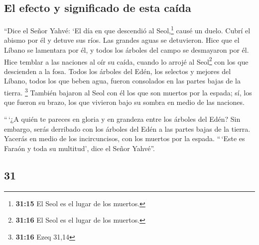 \begin{paracol}{2}
\hypertarget{el-efecto-y-significado-de-esta-cauxedda}{%
\subsection{El efecto y significado de esta
caída}\label{el-efecto-y-significado-de-esta-cauxedda}}

 ``Dice el Señor Yahvé: `El día en que descendió al
Seol,\footnote{\textbf{31:15} El Seol es el lugar de los muertos.} causé
un duelo. Cubrí el abismo por él y detuve sus ríos. Las grandes aguas se
detuvieron. Hice que el Líbano se lamentara por él, y todos los árboles
del campo se desmayaron por él.  Hice temblar a las
naciones al oír su caída, cuando lo arrojé al Seol\footnote{\textbf{31:16}
  El Seol es el lugar de los muertos.} con los que descienden a la fosa.
Todos los árboles del Edén, los selectos y mejores del Líbano, todos los
que beben agua, fueron consolados en las partes bajas de la tierra.
\footnote{\textbf{31:16} Ezeq 31,14}  También bajaron al
Seol con él los que son muertos por la espada; sí, los que fueron su
brazo, los que vivieron bajo su sombra en medio de las naciones.

 ``\,`¿A quién te pareces en gloria y en grandeza entre
los árboles del Edén? Sin embargo, serás derribado con los árboles del
Edén a las partes bajas de la tierra. Yacerás en medio de los
incircuncisos, con los muertos por la espada. ``\,`Este es Faraón y toda
su multitud', dice el Señor Yahvé''.

\switchcolumn
\begin{otherlanguage}{english}

\hypertarget{section-61}{%
\section{31}\label{section-61}}


\end{otherlanguage}
\end{paracol}
